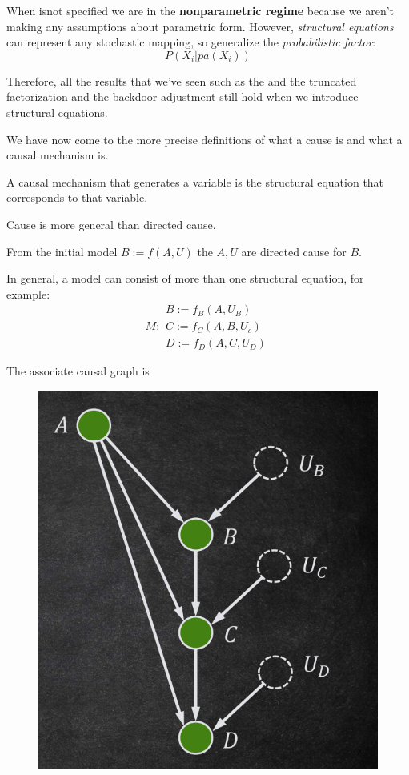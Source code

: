 When isnot specified we are in the \textbf{nonparametric regime} because we aren't making
any assumptions about parametric form. However, \textit{structural equations} can
represent any stochastic mapping, so generalize the \textit{probabilistic factor}:
\begin{equation}
    P(X_i|pa(X_i))
\end{equation}

Therefore, all the results that we've seen such as the and the truncated factorization and the
backdoor adjustment still hold when we introduce structural equations.

We have now come to the more precise definitions of what a cause is and what a causal
mechanism is.

\begin{definition}
    A causal mechanism that generates a variable is the structural equation
    that corresponds to that variable.
\end{definition}

\begin{note}
    Cause is more general than directed cause.
\end{note}

From the initial model $B:=f(A,U)$ the $A,U$ are directed cause for $B$.


In general, a model can consist of more than one structural equation, for example:
\begin{equation}
    M : \begin{array}{l}
        B := f_B(A, U_B) \\ C := f_C(A, B, U_c) \\ D := f_D(A, C, U_D)
    \end{array}
\end{equation}

The associate causal graph is

\begin{figure}[h]
    \centering
    \includegraphics*[width=0.5 \textwidth]{img/graph_associate_structural_equation.png}
\end{figure}

